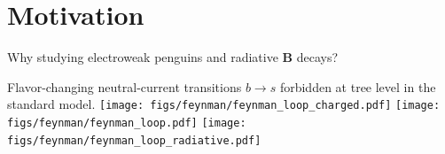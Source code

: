 \section{Motivation}
\begin{frame}{Why studying electroweak penguins and radiative $\boldsymbol{B}$ decays?}
\bi
\item {\footnotesize Flavor-changing neutral-current transitions $b\to s$ forbidden at tree level in the standard model.}
\bi
{}
\ei
{}
\ei
\vspace{0.1cm}
\centering
\texttt{[image: figs/feynman/feynman\_loop\_charged.pdf]}
\texttt{[image: figs/feynman/feynman\_loop.pdf]}
\texttt{[image: figs/feynman/feynman\_loop\_radiative.pdf]}
\end{frame}
